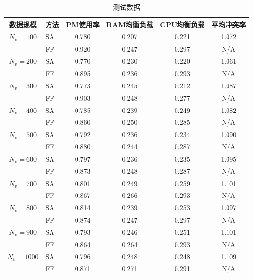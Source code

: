 \begin{table}[htbp]
  \centering
  \small
  \begin{threeparttable}
    \caption{\label{tab:result}测试数据}
    \begin{tabular}{clcccc}
      \toprule
数据规模       & 方法 & PM使用率 & RAM均衡负载 & CPU均衡负载 & 平均冲突率 \\
      \midrule
$ N_v = 100 $ & SA & 0.780 & 0.207 & 0.221 & 1.072 \\ 
              & FF & 0.920 & 0.247 & 0.297 & N/A \\
\hline 
$ N_v = 200 $ & SA & 0.770 & 0.230 & 0.220 & 1.061 \\
              & FF & 0.895 & 0.236 & 0.293 & N/A \\ 
\hline
$ N_v = 300 $ & SA & 0.773 & 0.245 & 0.212 & 1.087 \\ 
              & FF & 0.903 & 0.248 & 0.277 & N/A \\
\hline
$ N_v = 400 $ & SA & 0.785 & 0.239 & 0.249 & 1.082 \\
              & FF & 0.860 & 0.250 & 0.285 & N/A \\
\hline
$ N_v = 500 $ & SA & 0.792 & 0.236 & 0.234 & 1.090 \\ 
              & FF & 0.880 & 0.244 & 0.287 & N/A \\
\hline
$ N_v = 600 $ & SA & 0.797 & 0.236 & 0.235 & 1.095 \\
              & FF & 0.873 & 0.248 & 0.287 & N/A \\
\hline
$ N_v = 700 $ & SA & 0.801 & 0.249 & 0.259 & 1.101 \\
              & FF & 0.867 & 0.266 & 0.293 & N/A \\
\hline
$ N_v = 800 $ & SA & 0.814 & 0.239 & 0.253 & 1.097 \\ 
              & FF & 0.874 & 0.247 & 0.297 & N/A \\
\hline
$ N_v = 900 $ & SA & 0.793 & 0.246 & 0.251 & 1.101 \\ 
              & FF & 0.864 & 0.264 & 0.293 & N/A \\
\hline
$ N_v = 1000 $ & SA & 0.796 & 0.248 & 0.248 & 1.109 \\ 
               & FF & 0.871 & 0.271 & 0.291 & N/A \\

      \bottomrule
    \end{tabular}
  \end{threeparttable}
\end{table}

